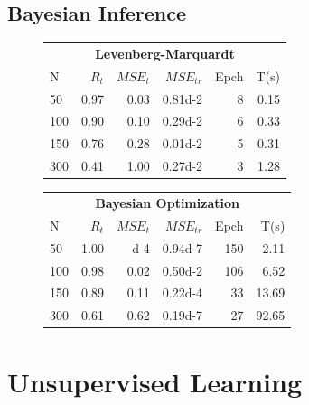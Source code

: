 \documentclass[a4paper, 10pt]{article}
\begin{document}
\subsection{Bayesian Inference}
  \begin{figure}[h]
    \centering
    \hfill
    \begin{tabular}{@{}lrrrrr@{}}
      \toprule
      \multicolumn{6}{c}{\textbf{Levenberg-Marquardt}} \\
      N  &   $R_t$  &  $MSE_t$ &  $MSE_{tr}$ & Epch  & T(s)\\
      \midrule
      50   &   0.97    &   0.03    &  \num{0.81d-2}  &  8   &  0.15  \\
      100  &   0.90    &   0.10    &  \num{0.29d-2}  &  6   &  0.33  \\
      150  &   0.76    &   0.28    &  \num{0.01d-2}  &  5   &  0.31  \\
      300  &   0.41    &   1.00    &  \num{0.27d-2}  &  3   &  1.28  \\
      \bottomrule
    \end{tabular} 
    \hfill
    \begin{tabular}{@{}lrrrrr@{}}
      \toprule
      \multicolumn{6}{c}{\textbf{Bayesian Optimization}} \\
      N  &   $R_t$  &  $MSE_t$ & $MSE_{tr}$  & Epch  & T(s)\\
      \midrule
      50   &   1.00    &   \num{d-4}  &  \num{0.94d-7}   & 150   &    2.11  \\
      100  &   0.98    &   0.02       &  \num{0.50d-2}   & 106   &    6.52  \\
      150  &   0.89    &   0.11       &  \num{0.22d-4}   &  33   &   13.69  \\
      300  &   0.61    &   0.62       &  \num{0.19d-7}   &  27   &   92.65  \\
      \bottomrule
    \end{tabular}  \hfill\mbox{}
    \caption{}
    \label{fig:bayes}
  \end{figure}

  





\newpage
\section{Unsupervised Learning}
\end{document}
